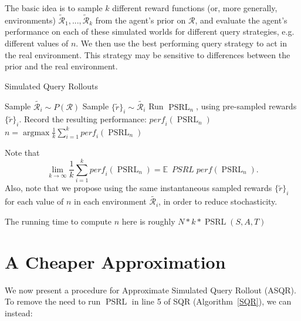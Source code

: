 \documentclass{article}
\begin{document}
The basic idea is to sample $k$ different reward functions (or, more generally, environments) $\mathcal{\tilde{R}}_1, ..., \mathcal{\tilde{R}}_k$ from the agent's prior on $\mathcal{R}$, and evaluate the agent's performance on each of these simulated worlds for different query strategies, e.g. different values of $n$.
We then use the best performing query strategy to act in the real environment.
This strategy may be sensitive to differences between the prior and the real environment.



\begin{algorithm}
\caption{Simulated Query Rollouts}
\label{SQR}
\begin{algorithmic}[1]
	\State Sample $\tilde{\mathcal{R}_i} \sim P(\mathcal{R})$
	\State Sample $\{\tilde{r}\}_i \sim \tilde{\mathcal{R}_i}$
		\State Run $\mathop{PSRL}_n$, using pre-sampled rewards $\{\tilde{r}\}_i$.
		\State Record the resulting performance: $\mathit{perf}_i(\mathop{PSRL}_n)$
	\EndFor
\EndFor
\Return $n = \mathop{\mathrm{argmax}} \frac{1}{k} \sum_{i=1}^k \mathit{perf}_i(\mathop{PSRL}_n)$ 
\end{algorithmic}
\end{algorithm}

Note that 
$$
\lim_{k \rightarrow \infty} \frac{1}{k} \sum_{i=1}^k \mathit{perf}_i(\mathop{PSRL}_n) = \mathbb{E} \: \mathit{\mathop{PSRL}perf}(\mathop{PSRL}_n).
$$
Also, note that we propose using the same instantaneous sampled rewards $\{\tilde{r}\}_i$ for each value of $n$ in each environment $\tilde{\mathcal{R}_i}$, in order to reduce stochasticity.

The running time to compute $n$ here is roughly $N * k * \mathop{PSRL}(S, A, T) $


\section{A Cheaper Approximation}
We now present a procedure for Approximate Simulated Query Rollout (ASQR).
To remove the need to run $\mathop{PSRL}$ in line 5 of SQR (Algorithm~\ref{SQR}), we can instead:
\end{document}
